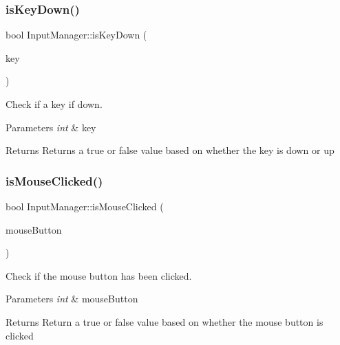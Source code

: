 \subsubsection{\texorpdfstring{is\+Key\+Down()}{isKeyDown()}}
{\footnotesize\ttfamily bool Input\+Manager\+::is\+Key\+Down (\begin{DoxyParamCaption}\item[{int}]{key }\end{DoxyParamCaption})}



Check if a key if down. 


\begin{DoxyParams}{Parameters}
{\em int} & key \\
\hline
\end{DoxyParams}
\begin{DoxyReturn}{Returns}
Returns a true or false value based on whether the key is down or up 
\end{DoxyReturn}
\mbox{\label{class_input_manager_aac8742d42b5444c2e6684c47e0184a79}} 
\subsubsection{\texorpdfstring{is\+Mouse\+Clicked()}{isMouseClicked()}}
{\footnotesize\ttfamily bool Input\+Manager\+::is\+Mouse\+Clicked (\begin{DoxyParamCaption}\item[{int}]{mouse\+Button }\end{DoxyParamCaption})}



Check if the mouse button has been clicked. 


\begin{DoxyParams}{Parameters}
{\em int} & mouse\+Button \\
\hline
\end{DoxyParams}
\begin{DoxyReturn}{Returns}
Return a true or false value based on whether the mouse button is clicked 
\end{DoxyReturn}
\mbox{\label{class_input_manager_aed26b5ce7bc1c27272f4bd198965bd4b}} 
